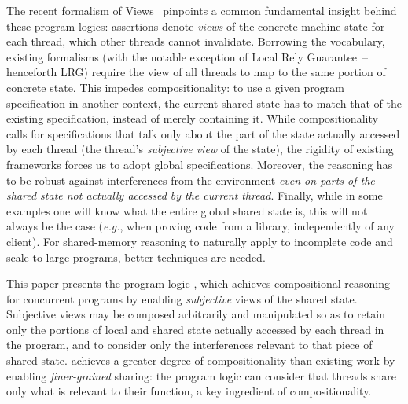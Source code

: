 The recent formalism of Views~\cite{views} pinpoints a common
fundamental insight behind these program logics: assertions denote
\emph{views} of the concrete machine state for each thread, which
other threads cannot invalidate. Borrowing the vocabulary, existing
formalisms (with the notable exception of Local Rely
Guarantee~\cite{lrg}--henceforth LRG) require the view of all threads
to map to the same portion of concrete state. This impedes
compositionality: to use a given program specification in another
context, the current shared state has to match that of the existing
specification, instead of merely containing it.  While
compositionality calls for specifications that talk only about the
part of the state actually accessed by each thread (the thread's
\emph{subjective view} of the state), the rigidity of existing
frameworks forces us to adopt global specifications. Moreover, the
reasoning has to be robust against interferences from the environment
\emph{even on parts of the shared state not actually accessed by the
  current thread}. Finally, while in some examples one will know what
the entire global shared state is, this will not always be the case
(\textit{e.g.}, when proving code from a library, independently of any
client). For shared-memory reasoning to naturally apply to incomplete
code and scale to large programs, better techniques are needed.


This paper presents the program logic \colosl, which achieves
compositional reasoning for concurrent programs by enabling
\emph{subjective} views of the shared state. Subjective views may be
composed arbitrarily and manipulated so as to retain only the portions
of local and shared state actually accessed by each thread in the
program, and to consider only the interferences relevant to that piece
of shared state. \colosl achieves a greater degree of compositionality
than existing work by enabling \emph{finer-grained} sharing: the
program logic can consider that threads share only what is relevant to
their function, a key ingredient of compositionality.

